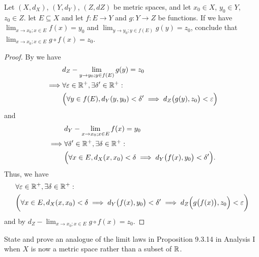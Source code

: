 \begin{ex}\label{ii:ex:3.1.5}
  Let \((X, d_X)\), \((Y, d_Y)\), \((Z, d Z)\) be metric spaces, and let \(x_0 \in X\), \(y_0 \in Y\), \(z_0 \in Z\).
  let \(E \subseteq X\) and let \(f : E \to Y\) and \(g : Y \to Z\) be functions.
  If we have \(\lim_{x \to x_0 ; x \in E} f(x) = y_0\) and \(\lim_{y \to y_0 ; y \in f(E)} g(y) = z_0\), conclude that \(\lim_{x \to x_0 ; x \in E} g \circ f(x) = z_0\).
\end{ex}

\begin{proof}
  By  we have
  \begin{align*}
             & d_Z - \lim_{y \to y_0 ; y \in f(E)} g(y) = z_0                                                    \\
    \implies & \forall \varepsilon \in \mathbb{R}^+, \exists \delta' \in \mathbb{R}^+ :                                          \\
             & \Big(\forall y \in f(E), d_Y(y, y_0) < \delta' \implies d_Z\big(g(y), z_0\big) < \varepsilon\Big)
  \end{align*}
  and
  \begin{align*}
             & d_Y - \lim_{x \to x_0 ; x \in E} f(x) = y_0                                                \\
    \implies & \forall \delta' \in \mathbb{R}^+, \exists \delta \in \mathbb{R}^+ :                                        \\
             & \Big(\forall x \in E, d_X(x, x_0) < \delta \implies d_Y\big(f(x), y_0\big) < \delta'\Big).
  \end{align*}
  Thus, we have
  \begin{align*}
     & \forall \varepsilon \in \mathbb{R}^+, \exists \delta \in \mathbb{R}^+ :                                                                                              \\
     & \bigg(\forall x \in E, d_X(x, x_0) < \delta \implies d_Y\big(f(x), y_0\big) < \delta' \implies d_Z\Big(g\big(f(x)\big), z_0\Big) < \varepsilon\bigg)
  \end{align*}
  and by  \(d_Z - \lim_{x \to x_0 ; x \in E} g \circ f(x) = z_0\).
\end{proof}

\begin{ex}\label{ii:ex:3.1.6}
  State and prove an analogue of the limit laws in Proposition 9.3.14 in Analysis I when \(X\) is now a metric space rather than a subset of \(\mathbb{R}\).
\end{ex}

